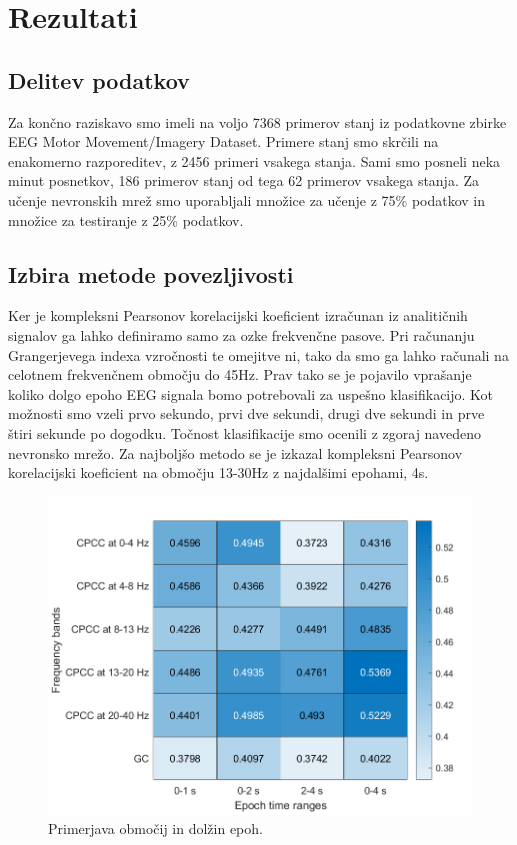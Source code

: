\chapter{Rezultati}
\section{Delitev podatkov}
Za končno raziskavo smo imeli na voljo 7368 primerov stanj iz podatkovne zbirke EEG Motor Movement/Imagery Dataset. Primere stanj smo skrčili na enakomerno razporeditev, z 2456 primeri vsakega stanja. Sami smo posneli neka minut posnetkov, 186 primerov stanj od tega 62 primerov vsakega stanja. Za učenje nevronskih mrež smo uporabljali množice za učenje z 75\% podatkov in množice za testiranje z 25\% podatkov.

\section{Izbira metode povezljivosti}
Ker je kompleksni Pearsonov korelacijski koeficient izračunan iz analitičnih signalov ga lahko definiramo samo za ozke frekvenčne pasove. Pri računanju Grangerjevega indexa vzročnosti te omejitve ni, tako da smo ga lahko računali na celotnem frekvenčnem območju do 45Hz. Prav tako se je pojavilo vprašanje koliko dolgo epoho EEG signala bomo potrebovali za uspešno klasifikacijo. Kot možnosti smo vzeli prvo sekundo, prvi dve sekundi, drugi dve sekundi in prve štiri sekunde po dogodku. Točnost klasifikacije smo ocenili z zgoraj navedeno nevronsko mrežo. Za najboljšo metodo se je izkazal kompleksni Pearsonov korelacijski koeficient na območju 13-30Hz z najdalšimi epohami, 4s.
\begin{figure}[h!]
    \begin{center}
    \includegraphics[width=0.5\linewidth]{slike/Comparison.png}
    \end{center}
    \caption{Primerjava območij in dolžin epoh.}
\end{figure}

